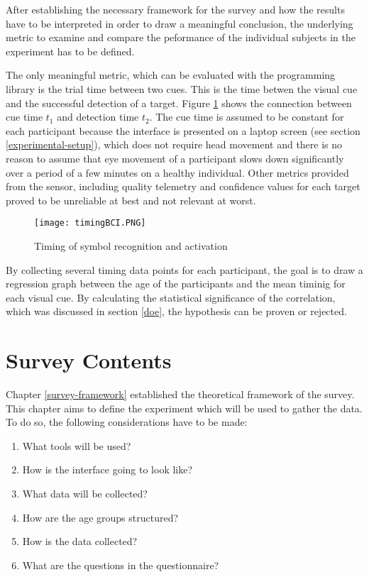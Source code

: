             After establishing the necessary framework for the survey and how the results have to be interpreted in order to draw a meaningful conclusion, the underlying metric to examine and compare the peformance of the individual subjects in the experiment has to be defined. 

            The only meaningful metric, which can be evaluated with the programming library is the trial time between two cues. This is the time betwen the visual cue and the successful detection of a target. Figure \ref*{itr-timing} shows the connection between cue time $t_{1}$ and detection time $t_{2}$. The cue time is assumed to be constant for each participant because the interface is presented on a laptop screen (see section \ref*{experimental-setup}), which does not require head movement and there is no reason to assume that eye movement of a participant slows down significantly over a period of a few minutes on a healthy individual. Other metrics provided from the sensor, including quality telemetry and confidence values for each target proved to be unreliable at best and not relevant at worst.

            \begin{figure}[h]     %
                \centering
                \texttt{[image: timingBCI.PNG]} 
                \caption{Timing of symbol recognition and activation}\label{itr-timing}
            \end{figure}

            By collecting several timing data points for each participant, the goal is to draw a regression graph between the age of the participants and the mean timinig for each visual cue. By calculating the statistical significance of the correlation, which was discussed in section \ref*{doe}, the hypothesis can be proven or rejected.

    \chapter{Survey Contents}\label{survey-contents}

        Chapter \ref{survey-framework} established the theoretical framework of the survey. This chapter aims to define the experiment which will be used to gather the data. To do so, the following considerations have to be made:

        \begin{enumerate}
            \item What tools will be used?
            \item How is the interface going to look like?
            \item What data will be collected?
            \item How are the age groups structured?
            \item How is the data collected?
            \item What are the questions in the questionnaire?
        \end{enumerate}

